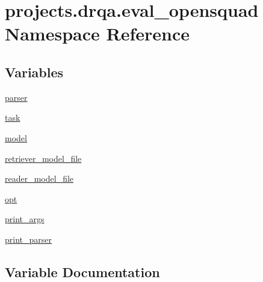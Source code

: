 \hypertarget{namespaceprojects_1_1drqa_1_1eval__opensquad}{}\section{projects.\+drqa.\+eval\+\_\+opensquad Namespace Reference}
\label{namespaceprojects_1_1drqa_1_1eval__opensquad}
\subsection*{Variables}
\begin{DoxyCompactItemize}
\item 
\hyperlink{namespaceprojects_1_1drqa_1_1eval__opensquad_aca05e49477b0c382916133871433dcdf}{parser}
\item 
\hyperlink{namespaceprojects_1_1drqa_1_1eval__opensquad_af449860119ed94cd3e72b341d27dc900}{task}
\item 
\hyperlink{namespaceprojects_1_1drqa_1_1eval__opensquad_a1f553346a2a1464aa5251677cf4e4890}{model}
\item 
\hyperlink{namespaceprojects_1_1drqa_1_1eval__opensquad_a1bb69d1a341755d6eee47a7d4f841d3c}{retriever\+\_\+model\+\_\+file}
\item 
\hyperlink{namespaceprojects_1_1drqa_1_1eval__opensquad_a0901b0afbe82efd624b7a51f3fcb4b32}{reader\+\_\+model\+\_\+file}
\item 
\hyperlink{namespaceprojects_1_1drqa_1_1eval__opensquad_a25d6a556450d3ddc82c089e3dbcae835}{opt}
\item 
\hyperlink{namespaceprojects_1_1drqa_1_1eval__opensquad_a324c68821789ec5a05397439f5656b13}{print\+\_\+args}
\item 
\hyperlink{namespaceprojects_1_1drqa_1_1eval__opensquad_a2859df7a3e2c268e413e14a9c7181160}{print\+\_\+parser}
\end{DoxyCompactItemize}


\subsection{Variable Documentation}
\mbox{\label{namespaceprojects_1_1drqa_1_1eval__opensquad_a1f553346a2a1464aa5251677cf4e4890}} 

